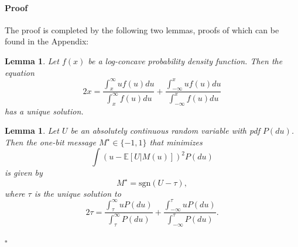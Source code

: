 \documentclass[letterpaper, conference]{IEEEtran}      %
\newtheorem{lem}[thm]{\bf {Lemma}}
\newenvironment{proof}{\paragraph*{Proof}}{\hfill$\square$ \newline}
\newcommand{\sgn}{\mathrm{sgn} }
\begin{document}
\begin{proof}
The proof is completed by the following two lemmas, proofs of which can be found in the Appendix:
\begin{lem} \label{lem:unique}
Let $f(x)$ be a log-concave probability density function. Then the equation 
\begin{equation}
\label{eq:lem_fixed_point}
2x = \frac{\int_x^\infty uf(u)du}{\int_x^\infty f(u)du} + \frac{\int_{-\infty}^x uf(u)du}{\int_{-\infty}^x f(u)du} 
\end{equation}
has a unique solution.
\end{lem}
\begin{lem} \label{lem:adaptive}
Let $U$ be an absolutely continuous random variable with
pdf $P(du)$. Then the one-bit message $M^\star\in \{-1,1\}$ that minimizes
\[
\int \left( u - \mathbb E[U|M(u)]  \right)^2 P(du)
\]
is given by
\[
M^\star  =  \sgn(U - \tau),
\]
where $\tau$ is the unique solution to
 \[
2 \tau = \frac{\int_{\tau}^\infty u P(du)} {\int_{\tau}^\infty P(du)} + \frac{\int_{-\infty}^{\tau} u P(du)}{\int_{-\infty}^{\tau} P(du)}.
\]
\end{lem}
\end{proof}
\end{document}
